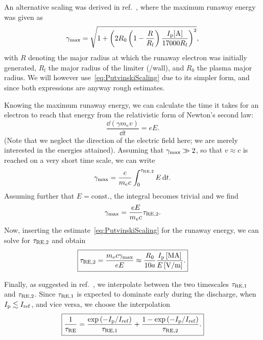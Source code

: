 \documentclass{notes}
\newcommand{\Ip}{I_{\rm p}}
\begin{document}
    An alternative scaling was derived in ref.~\cite{MartinSolis1999}, where the
    maximum runaway energy was given as
    \begin{equation}
        \gamma_{\rm max} = \sqrt{
            1+
            \left( 2R_0\left( 1 -\frac{R}{R_l}\right)\frac{\Ip [\si{A}]}{17000 R_l}\right)^2
        },
    \end{equation}
    with $R$ denoting the major radius at which the runaway electron was
    initially generated, $R_l$ the major radius of the limiter (/wall), and
    $R_0$ the plasma major radius. We will however
    use~\eqref{eq:PutvinskiScaling} due to its simpler form, and since both
    expressions are anyway rough estimates.

    Knowing the maximum runaway energy, we can calculate the time it takes for
    an electron to reach that energy from the relativistic form of Newton's
    second law:
    \begin{equation}
        \frac{\dd\left(\gamma m_ev\right)}{\dd t} = eE.
    \end{equation}
    (Note that we neglect the direction of the electric field here; we are
    merely interested in the energies attained). Assuming that
    $\gamma_{\rm max}\gg 2$, so that $v\approx c$ is reached on a very short
    time scale, we can write
    \begin{equation}
        \gamma_{\rm max} = \frac{e}{m_ec}\int_0^{\tau_{\rm RE,2}} E\,\mathrm{d} t.
    \end{equation}
    Assuming further that $E=\mathrm{const.}$, the integral becomes trivial
    and we find
    \begin{equation}
        \gamma_{\rm max} = \frac{eE}{m_ec}\tau_{\rm RE,2}.
    \end{equation}
    Now, inserting the estimate~\eqref{eq:PutvinskiScaling} for the runaway
    energy, we can solve for $\tau_{\rm RE,2}$ and obtain
    \begin{equation}
        \boxed{
        \tau_{\rm RE,2} = \frac{m_e c\gamma_{\rm max}}{eE} \approx
        \frac{R_0}{10a}\frac{\Ip\,[\si{MA}]}{E\,[\si{V/m}]}.
        }
    \end{equation}

    Finally, as suggested in ref.~\cite{Mineev2021}, we interpolate between
    the two timescales $\tau_{\rm RE,1}$ and $\tau_{\rm RE,2}$. Since
    $\tau_{\rm RE,1}$ is expected to dominate early during the discharge, when
    $\Ip\lesssim I_{\rm ref}$, and vice versa, we choose the interpolation
    \begin{equation}
        \boxed{
            \frac{1}{\tau_{\rm RE}} = \frac{\exp\left(-\Ip/I_{\rm ref}\right)}{\tau_{\rm RE,1}}
            + \frac{1-\exp\left(-\Ip/I_{\rm ref}\right)}{\tau_{\rm RE,2}}.
        }
    \end{equation}
\end{document}
